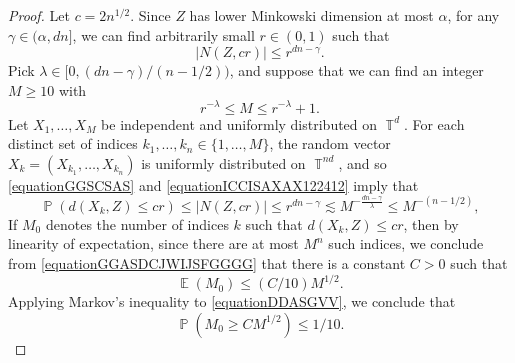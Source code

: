 \documentclass[dvipsnames,letterpaper,12pt]{article}
\numberwithin{equation}{section}
\DeclareMathOperator{\TT}{\mathbb{T}}
\numberwithin{theorem}{section}
\DeclareMathOperator{\EE}{\mathbb{E}}
\DeclareMathOperator{\PP}{\mathbb{P}}
\begin{document}
\begin{proof}
    Let $c = 2 n^{1/2}$. Since $Z$ has lower Minkowski dimension at most $\alpha$, for any $\gamma \in (\alpha,dn]$, we can find arbitrarily small $r \in (0,1)$ such that
    \begin{equation} \label{equationGGSCSAS}
        |N(Z, cr)| \leq r^{dn - \gamma}.
    \end{equation}
    Pick $\lambda \in [0,(dn - \gamma)/(n-1/2))$, and suppose that we can find an integer $M \geq 10$ with
    \begin{equation} \label{equationICCISAXAX122412}
        r^{-\lambda} \leq M \leq r^{-\lambda} + 1.
    \end{equation}
    Let $X_1, \dots, X_M$ be independent and uniformly distributed on $\TT^d$. For each distinct set of indices $k_1, \dots, k_n \in \{ 1, \dots, M \}$, the random vector $X_k = (X_{k_1}, \dots, X_{k_n})$ is uniformly distributed on $\TT^{nd}$, and so \eqref{equationGGSCSAS} and \eqref{equationICCISAXAX122412} imply that
    \begin{equation} \label{equationGGASDCJWIJSFGGGG}
        \PP(d(X_k,Z) \leq cr) \leq |N(Z,cr)| \leq r^{dn - \gamma} \lesssim M^{- \frac{dn - \gamma}{\lambda}} \leq M^{-(n-1/2)},
    \end{equation}
    If $M_0$ denotes the number of indices $k$ such that $d(X_k,Z) \leq cr$, then by linearity of expectation, since there are at most $M^n$ such indices, we conclude from \eqref{equationGGASDCJWIJSFGGGG} that there is a constant $C > 0$ such that
    \begin{equation} \label{equationDDASGVV}
        \EE(M_0) \leq (C/10) M^{1/2}.
    \end{equation}
    Applying Markov's inequality to \eqref{equationDDASGVV}, we conclude that
    \begin{equation} \label{equationFGGGSC}
        \PP(M_0 \geq C M^{1/2}) \leq 1/10.
    \end{equation}

\end{proof}
\end{document}
